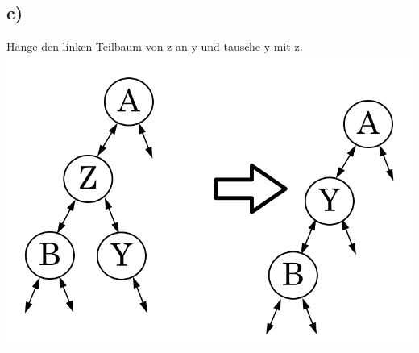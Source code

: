 \documentclass[a4paper,11pt,twoside]{article}
\begin{document}
\subsection*{c)} Hänge den linken Teilbaum von z an y und tausche y mit z. \\
\includegraphics*[scale=0.2]{Images/C.png}
\end{document}
